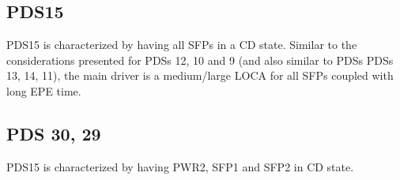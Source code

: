 \subsection{PDS15}
PDS15 is characterized by having all SFPs in a CD state. Similar to the considerations presented for PDSs 12, 10 and 9 (and also
similar to PDSs PDSs 13, 14, 11), the main driver is a medium/large LOCA for all SFPs coupled with long EPE time.

\subsection{PDS 30, 29}
PDS15 is characterized by having PWR2, SFP1 and SFP2 in CD state.
